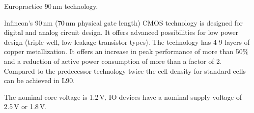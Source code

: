 Europractice 90\,nm technology.

Infineon’s 90\,nm (70\,nm physical gate length) CMOS technology is designed for digital
and analog circuit design. It offers advanced possibilities for low power design (triple
well, low leakage transistor types). The technology has 4-9 layers of copper metallization.
It offers an increase in peak performance of more than 50\% and a reduction of active
power consumption of more than a factor of 2. Compared to the predecessor technology
twice the cell density for standard cells can be achieved in L90.

The nominal core voltage is 1.2\,V, IO devices have a nominal supply voltage of 2.5\,V or
1.8\,V.